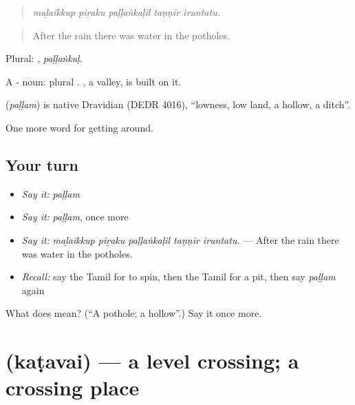 \begin{quote}
\emph{maḻaikkup piṟaku paḷḷaṅkaḷil taṇṇīr iruntatu.}
\end{quote}

\begin{quote}
After the rain there was water in the potholes.
\end{quote}

Plural: , \emph{paḷḷaṅkaḷ}.

A - noun: plural . , a valley, is built on it.

\begin{cousinweb}
\textbf{} (\emph{paḷḷam}) is native Dravidian (DEDR 4016), \textquotedblleft{}lowness, low land, a hollow, a ditch\textquotedblright{}.
\end{cousinweb}

\begin{grammarlens}[title={What you've built}]
One more word for getting around.
\end{grammarlens}

\subsection*{Your turn}
\begin{itemize}
\raggedright
  \item \emph{Say it:} \emph{paḷḷam}
  \item \emph{Say it:} \emph{paḷḷam}, once more
  \item \emph{Say it:} \emph{maḻaikkup piṟaku paḷḷaṅkaḷil taṇṇīr iruntatu.} — After the rain there was water in the potholes.
  \item \emph{Recall:} say the Tamil for to spin, then the Tamil for a pit, then say \emph{paḷḷam} again
\end{itemize}

\begin{tcolorbox}[breakable,colback=teal!4,colframe=teal!35!black,title={Before you move on}]
What does  mean? (\textquotedblleft{}A pothole; a hollow\textquotedblright{}.) Say it once more.
\end{tcolorbox}
\section[\texorpdfstring{\ta{கடவை} (kaṭavai)}{கடவை (kaṭavai)}]{ (kaṭavai) — a level crossing; a crossing place}

\label{lesson:TA-C409-katavai}




